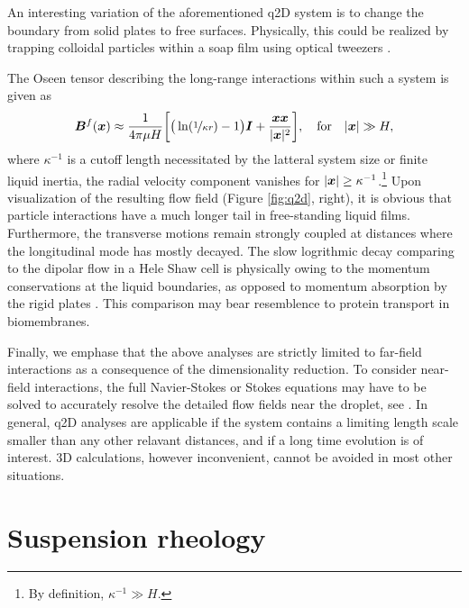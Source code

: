 \bigskip
An interesting variation of the aforementioned q2D system is to change the boundary from solid plates to free surfaces. Physically, this could be realized by trapping colloidal particles within a soap film using optical tweezers \citep{Leonardo_etal_2008}.

The Oseen tensor describing the long-range interactions within such a system is given as \citep{Leonardo_etal_2008, Diamant}
\begin{equation}
 \begin{aligned}
   {\bm B}^f({\bm x}) \approx \frac{1}{4\pi\mu H} \bigg[ \big( \ln(\nicefrac{1}{\kappa r}) -1 \big) {\bm I} +\frac{{\bm x}{\bm x} }{ \lvert{\bm x}\rvert^2} \bigg],
   \quad \textrm{for} \quad \lvert\bm x\rvert \gg H,
 \end{aligned}
\end{equation}
where $\kappa^{-1}$ is a cutoff length necessitated by the latteral system size or finite liquid inertia, \ie the radial velocity component vanishes for $\lvert\bm x\rvert \geq \kappa^{-1}$.\footnote{By definition, $\kappa^{-1} \gg H$.}
Upon visualization of the resulting flow field (Figure \ref{fig:q2d}, right), it is obvious that particle interactions have a much longer tail in free-standing liquid films. Furthermore, the transverse motions remain strongly coupled at distances where the longitudinal mode has mostly decayed.
The slow logrithmic decay comparing to the dipolar flow in a Hele Shaw cell is physically owing to the momentum conservations at the liquid boundaries, as opposed to momentum absorption by the rigid plates \citep{Diamant}.
This comparison may bear resemblence to protein transport in biomembranes. 

\bigskip
Finally, we emphase that the above analyses are strictly limited to far-field interactions as a consequence of the dimensionality reduction.
To consider near-field interactions, the full Navier-Stokes or Stokes equations may have to be solved to accurately resolve the detailed flow fields near the droplet, see \eg \cite{zhu_gallaire_2016, flow-assist}. 
In general, q2D analyses are applicable if the system contains a limiting length scale smaller than any other relavant distances, and if a long time evolution is of interest.
3D calculations, however inconvenient, cannot be avoided in most other situations.


\section{Suspension rheology}
\label{sec:sus-rheo}

